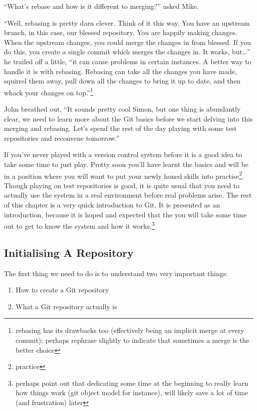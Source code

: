 \begin{trenches}
``What's rebase and how is it different to merging?'' asked Mike.

``Well, rebasing is pretty darn clever. Think of it this way. You have an upstream branch, in this case, our blessed repository. You are happily making changes. When the upstream changes, you could merge the changes in from blessed. If you do this, you create a single commit which merges the changes in. It works, but\ldots'' he trailed off a little,
``it can cause problems in certain instances. A better way to handle it is with rebasing. Rebasing can take all the changes you have made, squirrel them away, pull down all the changes to bring it up to date, and then whack your changes on top.''\footnote{rebasing has its drawbacks too (effectively being an implicit merge at every commit); perhaps rephrase slightly to indicate that sometimes a merge is the better choice}

John breathed out, ``It sounds pretty cool Simon, but one thing is abundantly clear, we need to learn more about the Git basics before we start delving into this merging and rebasing. Let's spend the rest of the day playing with some test repositories and reconvene tomorrow.''
\end{trenches}

If you've never played with a version control system before it is a good idea to take some time to just play.
Pretty soon you'll have learnt the basics and will be in a position where you will want to put your newly honed skills into practise\footnote{practice}.
Though playing on test repositories is good, it is quite usual that you need to actually use the system in a real environment before real problems arise.
The rest of this chapter is a very quick introduction to Git.
It is presented as an introduction, because it is hoped and expected that the you will take some time out to get to know the system and how it works.\footnote{perhaps point out that dedicating some time at the beginning to really learn how things work (git object model for instance), will likely save a lot of time (and frustration) later}

\subsection{Initialising A Repository}
The first thing we need to do is to understand two very important things:

\begin{enumerate}
  \item How to create a Git repository
  \item What a Git repository actually is
\end{enumerate}

